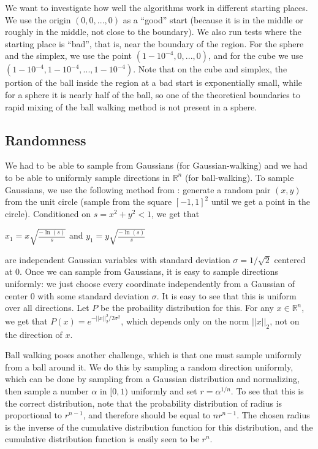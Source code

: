 \documentclass[11pt]{article}
\begin{document}
We want to investigate how well the algorithms work in different starting places. We use the origin $(0,0,...,0)$ as a ``good'' start (because it is in the middle or roughly in the middle, not close to the boundary). We also run tests where the starting place is ``bad'', that is, near the boundary of the region. For the sphere and the simplex, we use the point $(1 - 10^{-4}, 0, ..., 0)$, and for the cube we use $(1 - 10^{-4}, 1 - 10^{-4}, ..., 1 - 10^{-4})$. Note that on the cube and simplex, the portion of the ball inside the region at a bad start is exponentially small, while for a sphere it is nearly half of the ball, so one of the theoretical boundaries to rapid mixing of the ball walking method is not present in a sphere.

\subsection{Randomness}

We had to be able to sample from Gaussians (for Gaussian-walking) and we had to be able to uniformly sample directions in $\mathbb{R}^n$ (for ball-walking). To sample Gaussians, we use the following method from \cite{Marsaglia}: generate a random pair $(x,y)$ from the unit circle (sample from the square $[-1,1]^2$ until we get a point in the circle). Conditioned on $s = x^2 + y^2 < 1$, we get that
\begin{center}
$\displaystyle x_1 = x\sqrt{\frac{-\ln(s)}{s}}$ and $\displaystyle y_1 = y\sqrt{\frac{-\ln(s)}{s}}$
\end{center}
are independent Gaussian variables with standard deviation $\sigma = 1/\sqrt{2}$ centered at $0$. Once we can sample from Gaussians, it is easy to sample directions uniformly: we just choose every coordinate independently from a Gaussian of center $0$ with some standard deviation $\sigma$. It is easy to see that this is uniform over all directions. Let $P$ be the probaility distribution for this. For any $x\in\mathbb{R}^n$, we get that $P(x) = e^{-||x||_2^2 / 2\sigma^2}$, which depends only on the norm $||x||_2$, not on the direction of $x$.

Ball walking poses another challenge, which is that one must sample uniformly from a ball around it. We do this by sampling a random direction uniformly, which can be done by sampling from a Gaussian distribution and normalizing, then sample a number $\alpha$ in $[0,1)$ uniformly and set $r = \alpha^{1/n}$. To see that this is the correct distribution, note that the probability distribution of radius is proportional to $r^{n-1}$, and therefore should be equal to $nr^{n-1}$. The chosen radius is the inverse of the cumulative distribution function for this distribution, and the cumulative distribution function is easily seen to be $r^n$.
\end{document}
